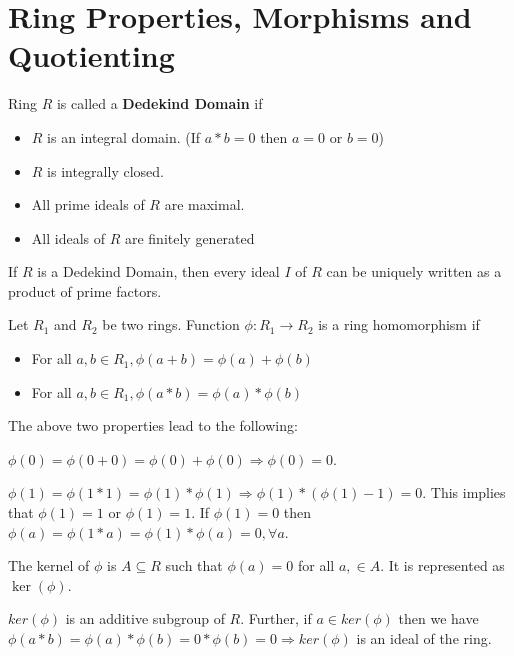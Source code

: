 \section{Ring Properties, Morphisms and Quotienting}
\begin{definition} \label{def:dedekind}
  Ring $R$ is called a \textbf{Dedekind Domain} if
  \begin{itemize}
    \item $R$ is an integral domain. (If $a*b = 0$ then $a = 0$ or $b = 0$)
    \item $R$ is integrally closed.
    \item All prime ideals of $R$ are maximal.
    \item All ideals of $R$ are finitely generated
  \end{itemize}
\end{definition}
\begin{theorem} \label{the:dedekind}
  If $R$ is a Dedekind Domain, then every ideal $I$ of $R$ can be uniquely written as a product of prime factors.
\end{theorem}
\begin{definition} \label{def:homomorphism}
  Let $R_{1}$ and $R_{2}$ be two rings.
  Function $\phi : R_{1} \rightarrow R_{2}$ is a ring homomorphism if
  \begin{itemize}
    \item For all $a, b \in R_{1}, \phi(a + b) = \phi(a) + \phi(b)$
    \item For all $a, b \in R_{1}, \phi(a * b) = \phi(a) * \phi(b)$
  \end{itemize}
\end{definition}
The above two properties lead to the following:
\par
$\phi(0) = \phi(0 + 0) = \phi(0) + \phi(0) \Rightarrow \phi(0) = 0$.
\par
$\phi(1) = \phi(1 * 1) = \phi(1) * \phi(1) \Rightarrow \phi(1) * (\phi(1) - 1) = 0$.
This implies that $\phi(1) = 1$ or $\phi(1) = 1$.
If $\phi(1) = 0$ then $\phi(a) = \phi(1 * a) = \phi(1) * \phi(a) = 0, \forall a$.
\begin{definition} \label{def:ringker}
  The kernel of $\phi$ is $A \subseteq R$ such that $\phi(a) = 0$ for all $a, \in A$.
  It is represented as $\ker(\phi)$.
\end{definition}
$ker(\phi)$ is an additive subgroup of $R$.
Further, if $a \in ker(\phi)$ then we have $\phi(a * b) = \phi(a) * \phi(b) = 0 * \phi(b) = 0 \Rightarrow ker(\phi)$ is an ideal of the ring.
\par
